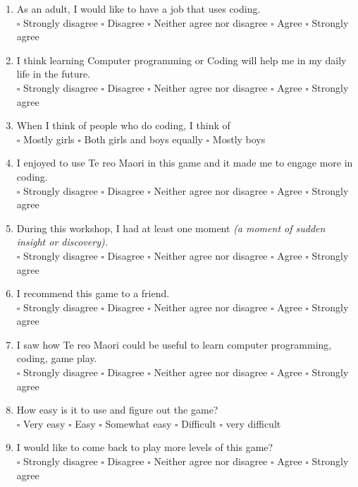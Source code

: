 \documentclass[12pt]{article}\pagestyle{myheadings}
\theoremstyle{plain}
\begin{document}
\begin{enumerate}
\item As an adult, I would like to have a job that uses coding. \\ 
$\square$ Strongly disagree $\square$ Disagree $\square$ Neither agree nor disagree $\square$ Agree $\square$ Strongly agree


\item I think learning Computer programming or Coding will help me in my daily life in the future.\\
$\square$ Strongly disagree $\square$ Disagree $\square$ Neither agree nor disagree $\square$ Agree $\square$ Strongly agree



\item When I think of people who do coding, I think of \\
$\square$ Mostly girls $\square$ Both girls and boys equally $\square$ Mostly boys


\item I enjoyed to use Te reo Maori in this game and it made me to engage more in coding. \\
$\square$ Strongly disagree $\square$ Disagree $\square$ Neither agree nor disagree $\square$ Agree $\square$ Strongly agree

\item During this workshop, I had at least one  moment \textit{(a moment of sudden insight or discovery).} \\
$\square$ Strongly disagree $\square$ Disagree $\square$ Neither agree nor disagree $\square$ Agree $\square$ Strongly agree

\item I recommend this game to a friend. \\
$\square$ Strongly disagree $\square$ Disagree $\square$ Neither agree nor disagree $\square$ Agree $\square$ Strongly agree


\item I saw how Te reo Maori could be useful to learn computer programming, coding, game play. \\
$\square$ Strongly disagree $\square$ Disagree $\square$ Neither agree nor disagree $\square$ Agree $\square$ Strongly agree


\item  How easy is it to use and figure out the game?\\
$\square$ Very easy $\square$ Easy $\square$ Somewhat easy $\square$ Difficult $\square$ very difficult


\item I would like to come back to play more levels of this game?\\ 
$\square$ Strongly disagree $\square$ Disagree $\square$ Neither agree nor disagree $\square$ Agree $\square$ Strongly agree



\end{enumerate}
\end{document}
